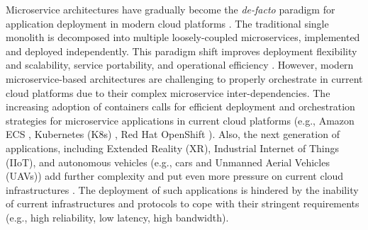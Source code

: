 \documentclass[conference]{IEEEtran}
\begin{document}
Microservice architectures have gradually become the \textit{de-facto} paradigm for application deployment in modern cloud platforms \cite{dragoni2017microservices, larrucea2018microservices}. The traditional single monolith is decomposed into multiple loosely-coupled microservices, implemented and deployed independently. This paradigm shift improves deployment flexibility and scalability, service portability, and operational efficiency \cite{schneider2016connected}. However, modern microservice-based architectures are challenging to properly orchestrate in current cloud platforms due to their complex microservice inter-dependencies. The increasing adoption of containers calls for efficient deployment and orchestration strategies for microservice applications in current cloud platforms (e.g., Amazon ECS \cite{amazonECS}, Kubernetes (K8s) \cite{burns2019kubernetes}, Red Hat OpenShift \cite{redhat2021openshift}). Also, the next generation of applications, including Extended Reality (XR), Industrial Internet of Things (IIoT), and autonomous vehicles (e.g., cars and Unmanned Aerial Vehicles (UAVs)) add further complexity and put even more pressure on current cloud infrastructures \cite{giordani2020toward, santos2021towards}. The deployment of such applications is hindered by the inability of current infrastructures and protocols to cope with their stringent requirements (e.g., high reliability, low latency, high bandwidth).
\end{document}
